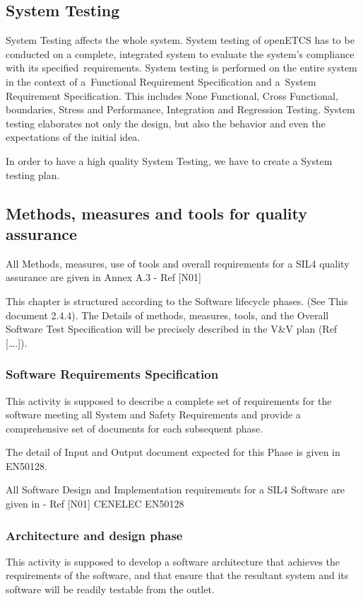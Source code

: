 \documentclass{template/openetcs_article}
\begin{document}
\subsection{System Testing}
System Testing affects the whole system. System testing of openETCS has to be conducted on a complete, integrated system to evaluate the system's compliance with its specified~requirements. System testing is performed on the entire system in the context of a~Functional Requirement Specification and a~System Requirement Specification. This includes None Functional, Cross Functional, boundaries, Stress and Performance, Integration and Regression Testing. System testing elaborates not only the design, but also the behavior and even the expectations of the initial idea.

In order to have a high quality System Testing, we have to create a System testing plan. 

\subsection{Methods, measures and tools for quality assurance}
All Methods, measures, use of tools and overall requirements for a SIL4 quality assurance are given in Annex A.3 - Ref [N01]

This chapter is structured according to the Software lifecycle phases. (See This document 2.4.4). The Details of methods, measures, tools, and the Overall Software Test Specification will be precisely described in the V\&V plan (Ref [{\dots}.]).


\subsubsection{Software Requirements Specification}
This activity is supposed to describe a complete set of requirements for the software meeting all System and Safety Requirements and provide a comprehensive set of documents for each subsequent phase.

The detail of Input and Output document expected for this Phase is given in EN50128.

All Software Design and Implementation requirements for a SIL4 Software are given in - Ref [N01] CENELEC EN50128


\subsubsection{Architecture and design phase}
This activity is supposed to develop a software architecture that achieves the requirements of the software, and that ensure that the resultant system and its software will be readily testable from the outlet. 
\end{document}
